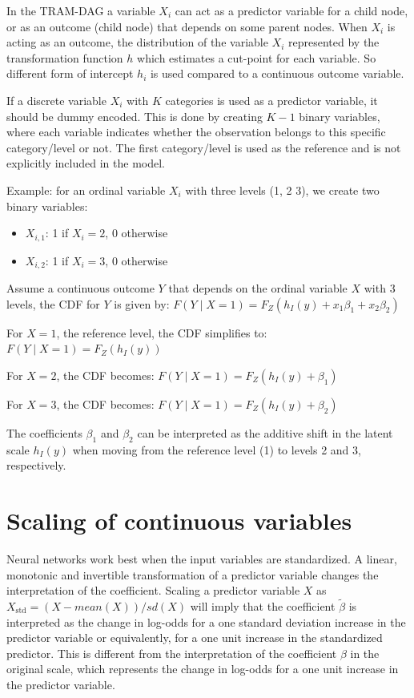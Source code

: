 In the TRAM-DAG a variable $X_i$ can act as a predictor variable for a child node, or as an outcome (child node) that depends on some parent nodes. When $X_i$ is acting as an outcome, the distribution of the variable $X_i$ represented by the transformation function $h$ which estimates a cut-point for each variable. So different form of intercept $h_i$ is used compared to a continuous outcome variable.

If a discrete variable $X_i$ with $K$ categories is used as a predictor variable, it should be dummy encoded. This is done by creating $K-1$ binary variables, where each variable indicates whether the observation belongs to this specific category/level or not. The first category/level is used as the reference and is not explicitly included in the model.

Example: for an ordinal variable $X_i$ with three levels (1, 2 3), we create two binary variables:

\begin{itemize}
  \item $X_{i,1}$: 1 if $X_i = 2$, 0 otherwise
  \item $X_{i,2}$: 1 if $X_i = 3$, 0 otherwise
\end{itemize}

Assume a continuous outcome $Y$ that depends on the ordinal variable $X$ with 3 levels, the CDF for $Y$ is given by: 
$F(Y \mid X=1) = F_Z(h_I(y) + x_1\beta_1 + x_2\beta_2)$ 

For $X=1$, the reference level, the CDF simplifies to: 
$F(Y \mid X=1) = F_Z(h_I(y))$

For $X=2$, the CDF becomes: $F(Y \mid X=1) = F_Z(h_I(y) + \beta_1)$

For $X=3$, the CDF becomes: $F(Y \mid X=1) = F_Z(h_I(y) + \beta_2)$

The coefficients $\beta_1$ and $\beta_2$ can be interpreted as the additive shift in the latent scale $h_I(y)$ when moving from the reference level (1) to levels 2 and 3, respectively.


\section{Scaling of continuous variables} \label{sec:scaling_continuous_variables}

Neural networks work best when the input variables are standardized. A linear, monotonic and invertible transformation of a predictor variable changes the interpretation of the coefficient. Scaling a predictor variable $X$ as $X_{\text{std}} = (X - mean(X)) / sd(X)$ will imply that the coefficient $\tilde{\beta}$ is interpreted as the change in log-odds for a one standard deviation increase in the predictor variable or equivalently, for a one unit increase in the standardized predictor. This is different from the interpretation of the coefficient $\beta$ in the original scale, which represents the change in log-odds for a one unit increase in the predictor variable.





